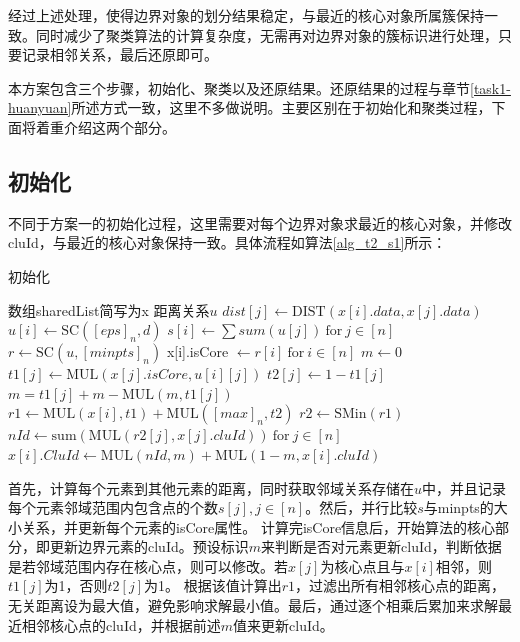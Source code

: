 经过上述处理，使得边界对象的划分结果稳定，与最近的核心对象所属簇保持一致。同时减少了聚类算法的计算复杂度，无需再对边界对象的簇标识进行处理，只要记录相邻关系，最后还原即可。

本方案包含三个步骤，初始化、聚类以及还原结果。还原结果的过程与章节\ref{task1-huanyuan}所述方式一致，这里不多做说明。主要区别在于初始化和聚类过程，下面将着重介绍这两个部分。

\subsection{初始化}
不同于方案一的初始化过程，这里需要对每个边界对象求最近的核心对象，并修改cluId，与最近的核心对象保持一致。具体流程如算法\ref{alg_t2_s1}所示：
\begin{algorithm}[htbp]
	\renewcommand{\algorithmicrequire}{\textbf{输入:}}
	\renewcommand{\algorithmicensure}{\textbf{输出:}}
	\caption{初始化}
	\label{alg_t2_s1}
	\begin{algorithmic}[1]
		\REQUIRE 数组sharedList简写为x
		\ENSURE 距离关系$ u $
		\STATE $ dist[j] \leftarrow \text{DIST}(x[i].data, x[j].data) $
		\ENDFOR
		\STATE $ u[i] \leftarrow \text{SC}([eps]_n, d) $
		\STATE $ s[i] \leftarrow \sum{sum}(u[j])\ \text{for}\ j\in[n]$
		\ENDFOR
		\STATE $ r \leftarrow \text{SC}(u, [minpts]_n) $
		\STATE x[i].isCore $\leftarrow r[i]\ \text{for}\ i\in[n] $
		\STATE $ m \leftarrow 0 $
		\STATE $ t1[j] \leftarrow \text{MUL}(x[j].isCore, u[i][j]) $
		\STATE $ t2[j] \leftarrow 1-t1[j] $
		\STATE $ m = t1[j] + m - \text{MUL}(m, t1[j]) $
		\ENDFOR
		\STATE $ r1 \leftarrow \text{MUL}(x[i], t1) + \text{MUL}([max]_n, t2) $
		\STATE $ r2 \leftarrow \text{SMin}(r1) $
		\STATE $ nId \leftarrow \text{sum}(\text{MUL}(r2[j], x[j].cluId))\ \text{for}\ j \in [n] $
		\STATE $ x[i].CluId \leftarrow \text{MUL}(nId, m) + \text{MUL}(1-m, x[i].cluId)$
		\ENDFOR
	\end{algorithmic}
\end{algorithm}
首先，计算每个元素到其他元素的距离，同时获取邻域关系存储在$ u $中，并且记录每个元素邻域范围内包含点的个数$ s[j],j\in[n] $。然后，并行比较$ s $与minpts的大小关系，并更新每个元素的isCore属性。
计算完isCore信息后，开始算法的核心部分，即更新边界元素的cluId。预设标识$ m $来判断是否对元素更新cluId，判断依据是若邻域范围内存在核心点，则可以修改。若$ x[j] $为核心点且与$ x[i] $相邻，则$ t1[j] $为1，否则$ t2[j] $为1。
根据该值计算出$ r1 $，过滤出所有相邻核心点的距离，无关距离设为最大值，避免影响求解最小值。最后，通过逐个相乘后累加来求解最近相邻核心点的cluId，并根据前述$ m $值来更新cluId。

